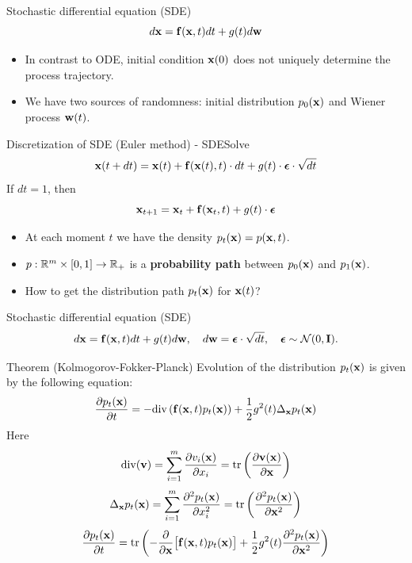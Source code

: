 \begin{frame}{Stochastic differential equation (SDE)}
	\[
		d\mathbf{x} = \mathbf{f}(\mathbf{x}, t) dt + g(t) d \mathbf{w}
	\]
	\vspace{-0.3cm}
	\begin{itemize}
		\item In contrast to ODE, initial condition $\mathbf{x}(0)$ does not uniquely determine the process trajectory.
		\item We have two sources of randomness: initial distribution $p_0(\mathbf{x})$ and Wiener process $\mathbf{w}(t)$.
	\end{itemize}
	\begin{block}{Discretization of SDE (Euler method) - SDESolve}
		\vspace{-0.3cm}
		\[
			\mathbf{x}(t + dt) = \mathbf{x}(t) + \mathbf{f}(\mathbf{x}(t), t) \cdot dt + g(t) \cdot \boldsymbol{\epsilon} \cdot \sqrt{dt}
		\]
		If $dt = 1$, then
		\vspace{-0.3cm}
		\[
			\mathbf{x}_{t + 1} = \mathbf{x}_t + \mathbf{f}(\mathbf{x}_t, t) + g(t) \cdot \boldsymbol{\epsilon}
		\]
		\vspace{-0.7cm}
	\end{block}
	\begin{itemize}
		\item At each moment $t$ we have the density $p_t(\mathbf{x}) = p(\mathbf{x}, t)$.
		\item $p: \mathbb{R}^m \times [0, 1] \rightarrow \mathbb{R}_+$ is a \textbf{probability path} between $p_0(\mathbf{x})$ and $p_1(\mathbf{x})$.
		\item How to get the distribution path $p_t(\mathbf{x})$ for $\mathbf{x}(t)$?
	\end{itemize}
\end{frame}
\begin{frame}{Stochastic differential equation (SDE)}
	\vspace{-0.4cm}
	\[
		d\mathbf{x} = \mathbf{f}(\mathbf{x}, t) dt + g(t) d \mathbf{w}, \quad d \mathbf{w} = \boldsymbol{\epsilon} \cdot \sqrt{dt}, \quad \boldsymbol{\epsilon} \sim \mathcal{N}(0, \mathbf{I}).
	\]
	\vspace{-0.4cm}
 	\begin{block}{Theorem (Kolmogorov-Fokker-Planck)}
 		Evolution of the distribution $p_t(\mathbf{x})$ is given by the following equation:
 		\vspace{-0.2cm}
 		\[
 			\frac{\partial p_t(\mathbf{x})}{\partial t} = - \text{div}\left(\mathbf{f}(\mathbf{x}, t) p_t(\mathbf{x})\right) + \frac{1}{2}g^2(t) \Delta_{\mathbf{x}}p_t(\mathbf{x})
 		\]
 		Here
 		\[
 			\text{div} (\mathbf{v}) = \sum_{i=1}^m \frac{\partial v_i(\mathbf{x})}{\partial x_i} = \text{tr}\left( \frac{\partial \mathbf{v}(\mathbf{x})}{\partial \mathbf{x}}  \right)
 		\]
 		\[
 			\Delta_{\mathbf{x}}p_t(\mathbf{x}) = \sum_{i=1}^m \frac{\partial^2 p_t(\mathbf{x})}{\partial x_i^2} = \text{tr}\left( \frac{\partial^2 p_t(\mathbf{x})}{\partial \mathbf{x}^2}  \right)
 		\]
 		\[
 			\frac{\partial p_t(\mathbf{x})}{\partial t} = \text{tr}\left(- \frac{\partial}{\partial \mathbf{x}} \bigl[ \mathbf{f}(\mathbf{x}, t) p_t(\mathbf{x})\bigr] + \frac{1}{2} g^2(t) \frac{\partial^2 p_t(\mathbf{x})}{\partial \mathbf{x}^2} \right)
 		\]
 	\end{block}
\end{frame}

